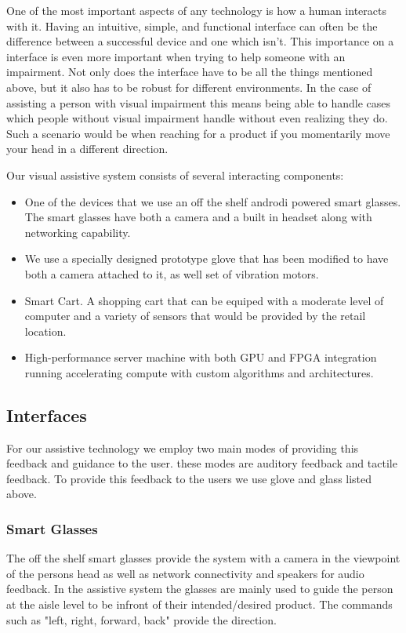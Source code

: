 One of the most important aspects of any technology is how a human interacts with it.
Having an intuitive, simple, and functional interface can often be the difference between
a successful device and one which isn't. This importance on a interface is even more important
when trying to help someone with an impairment. Not only does the interface have to be all
the things mentioned above, but it also has to be robust for different environments. In the
case of assisting a person with visual impairment this means being able to handle cases
which people without visual impairment handle without even realizing they do. Such a scenario
would be when reaching for a product if you momentarily move your head in a different direction.

Our visual assistive system consists of several interacting components: 

\begin{itemize}
\item One of the devices that we use an off the shelf androdi powered smart glasses. 
The smart glasses have both a camera and a built in headset along with
networking capability. 
\item We use a specially designed prototype glove that has been
modified to have both a camera attached to it, as well set of
vibration motors. 
\item Smart Cart. A shopping cart that can be equiped with a moderate level of computer
and a variety of sensors that would be provided by the retail location.
\item High-performance server machine with both GPU and FPGA integration running
accelerating compute with custom algorithms and architectures.
\end{itemize}
\subsection{Interfaces}
For our assistive technology we employ two main modes of providing this feedback and guidance to the user. these modes are auditory feedback and tactile feedback. To provide this feedback to the users we use glove and glass listed above.
\subsubsection{Smart Glasses}
The off the shelf smart glasses provide the system with a camera in the viewpoint
of the persons head as well as network connectivity and speakers for audio feedback.
In the assistive system the glasses are mainly used to guide the person at the aisle level
to be infront of their intended/desired product. The commands such as "left, right, forward, back"
provide the direction. 
